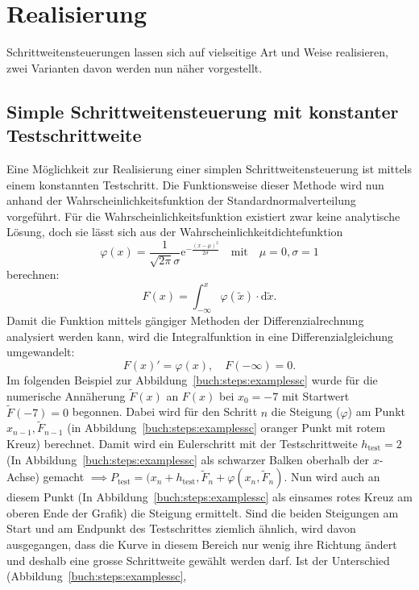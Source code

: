 %
%
%
\section{Realisierung
  \label{steps:section:loesung}}
Schrittweitensteuerungen lassen sich auf vielseitige Art und Weise realisieren,
zwei Varianten davon werden nun näher vorgestellt.

\subsection{Simple Schrittweitensteuerung mit konstanter Testschrittweite
  \label{steps:subsection:simplestep}}
Eine Möglichkeit zur Realisierung einer simplen Schrittweitensteuerung ist mittels einem konstannten Testschritt.
Die Funktionsweise dieser Methode wird nun anhand der Wahrscheinlichkeitsfunktion der Standardnormalverteilung vorgeführt.
Für die Wahrscheinlichkeitsfunktion existiert zwar keine analytische Lösung,
doch sie lässt sich aus der Wahrscheinlichkeitdichtefunktion
\[
  \varphi(x)=\frac{1}{\sqrt{2\pi}\sigma}\mathrm{e}^{-\frac{(x-\mu)^2}{2 \sigma}}\quad \text{mit} \quad \mu=0,\sigma=1
\]
berechnen:
\[
  F(x)=\int_{-\infty}^{x} \varphi (\tilde{x}) \cdot \mathrm{d} \tilde{x}.
\]
Damit die Funktion mittels gängiger Methoden der Differenzialrechnung analysiert werden kann,
wird die Integralfunktion in eine Differenzialgleichung umgewandelt:
\[
  F(x)'=\varphi(x), \quad F(-\infty)=0.
\]
Im folgenden Beispiel zur Abbildung~\ref{buch:steps:examplessc}
wurde für die numerische Annäherung $\tilde{F}(x)$ an $F(x)$ bei $x_0=-7$ mit Startwert $\tilde{F}(-7)=0$ begonnen.
Dabei wird für den Schritt $n$ die Steigung ($\varphi$) am Punkt $x_{n-1}, \tilde{F}_{n-1}$ (in Abbildung~\ref{buch:steps:examplessc} oranger Punkt mit rotem Kreuz) berechnet.
Damit wird ein Eulerschritt mit der Testschrittweite $h_\text{test}=2$ (In Abbildung~\ref{buch:steps:examplessc} als schwarzer Balken oberhalb der $x$-Achse) gemacht
$\implies P_\text{test}=(x_n+h_\text{test}, \tilde{F}_n+\varphi(x_n, \tilde{F}_n)$.
Nun wird auch an diesem Punkt (In Abbildung~\ref{buch:steps:examplessc} als einsames rotes Kreuz am oberen Ende der Grafik) die Steigung ermittelt.
Sind die beiden Steigungen am Start und am Endpunkt des Testschrittes ziemlich ähnlich, wird davon ausgegangen,
dass die Kurve in diesem Bereich nur wenig ihre Richtung ändert und deshalb eine grosse Schrittweite gewählt werden darf.
Ist der Unterschied (Abbildung~\ref{buch:steps:examplessc},
